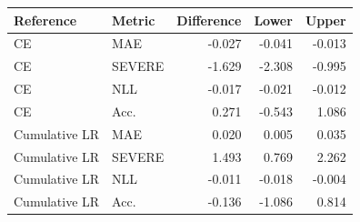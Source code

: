 \begin{tabular}{llrrr}
\toprule
Reference & Metric & Difference & Lower & Upper \\
\midrule
CE & MAE & -0.027 & -0.041 & -0.013 \\
CE & SEVERE & -1.629 & -2.308 & -0.995 \\
CE & NLL & -0.017 & -0.021 & -0.012 \\
CE & Acc. & 0.271 & -0.543 & 1.086 \\
Cumulative LR & MAE & 0.020 & 0.005 & 0.035 \\
Cumulative LR & SEVERE & 1.493 & 0.769 & 2.262 \\
Cumulative LR & NLL & -0.011 & -0.018 & -0.004 \\
Cumulative LR & Acc. & -0.136 & -1.086 & 0.814 \\
\bottomrule
\end{tabular}